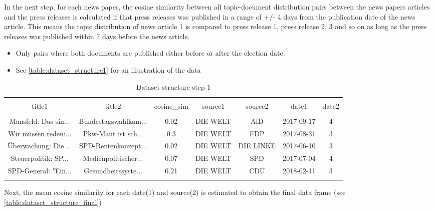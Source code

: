 \documentclass[
]{article}
\providecommand{\tightlist}{%
  \setlength{\itemsep}{0pt}\setlength{\parskip}{0pt}}
\begin{document}
In the next step, for each news paper, the cosine similarity between all
topic-document distribution pairs between the news papers articles and
the press releases is calculated if that press releases was published in
a range of +/- 4 days from the publication date of the news article.
This means the topic distribution of news article 1 is compared to press
release 1, press release 2, 3 and so on as long as the press releases
was published within 7 days before the news article.

\begin{itemize}
\tightlist
\item
  Only pairs where both documents are published either before or after
  the election date.
\item
  See \autoref{table:dataset_structure1} for an illustration of the data
\end{itemize}

\begin{table}[!htbp] \centering 
  \caption{Dataset structure step 1} 
  \label{table:dataset_structure1} 
\tiny 
\begin{tabular}{@{\extracolsep{5pt}} ccccccc} 
\\[-1.8ex]\hline 
\hline \\[-1.8ex] 
title1 & title2 & cosine\_sim & source1 & source2 & date1 & date2 \\ 
\hline \\[-1.8ex] 
Mansfeld: Das sin... & Bundestagswahlkam... & 0.02 & DIE WELT & AfD & 2017-09-17 & 4 \\ 
Wir müssen reden:... &  Pkw-Maut ist sch... & 0.3 & DIE WELT & FDP & 2017-08-31 & 3 \\ 
Überwachung: Die ... & SPD-Rentenkonzept... & 0.02 & DIE WELT & DIE LINKE & 2017-06-10 & 3 \\ 
Steuerpolitik: SP... & Medienpolitischer... & 0.07 & DIE WELT & SPD & 2017-07-04 & 4 \\ 
SPD-General: "Ein... &  Gesundheitssyste... & 0.21 & DIE WELT & CDU & 2018-02-11 & 3 \\ 
\hline \\[-1.8ex] 
\end{tabular} 
\end{table}

Next, the mean cosine similarity for each date(1) and source(2) is
estimated to obtain the final data frame (see
\autoref{table:dataset_structure_final})
\end{document}
